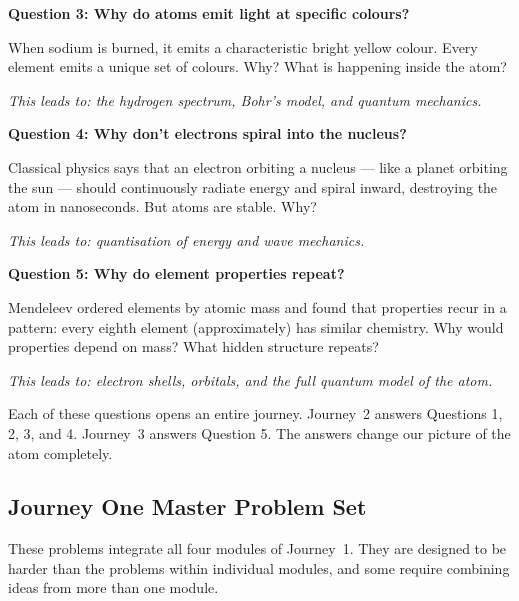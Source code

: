 \documentclass[12pt, a4paper]{book}
\theoremstyle{definition}
\begin{document}
\begin{openquestion}
\textbf{Question 3: Why do atoms emit light at specific colours?}

When sodium is burned, it emits a characteristic bright
yellow colour. Every element emits a unique set of colours.
Why? What is happening inside the atom?

\vspace{0.3em}
\textit{This leads to: the hydrogen spectrum, Bohr's model,
and quantum mechanics.}
\end{openquestion}

\begin{openquestion}
\textbf{Question 4: Why don't electrons spiral into the nucleus?}

Classical physics says that an electron orbiting a nucleus ---
like a planet orbiting the sun --- should continuously radiate
energy and spiral inward, destroying the atom in nanoseconds.
But atoms are stable. Why?

\vspace{0.3em}
\textit{This leads to: quantisation of energy and wave mechanics.}
\end{openquestion}

\begin{openquestion}
\textbf{Question 5: Why do element properties repeat?}

Mendeleev ordered elements by atomic mass and found that
properties recur in a pattern: every eighth element
(approximately) has similar chemistry.
Why would properties depend on mass?
What hidden structure repeats?

\vspace{0.3em}
\textit{This leads to: electron shells, orbitals,
and the full quantum model of the atom.}
\end{openquestion}

\vspace{0.5em}

Each of these questions opens an entire journey.
Journey~2 answers Questions 1, 2, 3, and 4.
Journey~3 answers Question 5.
The answers change our picture of the atom completely.

\subsection{Journey One Master Problem Set}

These problems integrate all four modules of Journey~1.
They are designed to be harder than the problems within
individual modules, and some require combining ideas
from more than one module.
\end{document}
